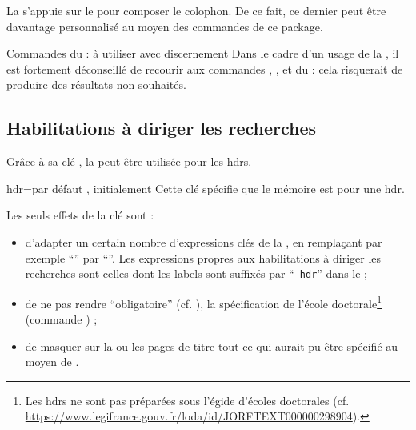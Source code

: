 La \yatCl{} s'appuie sur le  pour composer le colophon. De ce
fait, ce dernier peut être davantage personnalisé au moyen des commandes de ce
package.

\begin{dbwarning}{Commandes du  : à utiliser avec
    discernement}{}
  Dans le cadre d’un usage de la \yatCl{}, il est fortement déconseillé de
  recourir aux commandes ,
  ,  et
   du  : cela risquerait de
  produire des résultats non souhaités.
\end{dbwarning}

\subsection{Habilitations à diriger les recherches}
\label{sec-hdr}%

Grâce à sa clé , la \yatCl{} peut être utilisée pour les
\glspl{hdr}.

\begin{docKey}{hdr}{=\textbar{}}{par défaut
    , initialement }
  Cette clé spécifie que le mémoire est pour une \gls{hdr}.
\end{docKey}

Les seuls effets de la clé  sont :
\begin{itemize}
\item d'adapter un certain nombre d'expressions clés de la \yatCl{}, en
  remplaçant par exemple
  \enquote{\foreignlanguage{french}{}} par
  \enquote{\foreignlanguage{french}{}}. Les
  expressions propres aux habilitations à diriger les recherches sont celles
  dont les labels sont suffixés par \enquote{\texttt{-hdr}} dans le
   ;
\item de ne pas rendre \enquote{obligatoire} (cf. ), la
  spécification de l'école doctorale\footnote{Les \glspl{hdr} ne sont pas
    préparées sous l'égide d'écoles doctorales (cf.
    \url{https://www.legifrance.gouv.fr/loda/id/JORFTEXT000000298904}).}
  (commande ) ;
\item de masquer sur la ou les pages de titre tout ce qui aurait pu être
  spécifié au moyen de .
\end{itemize}

